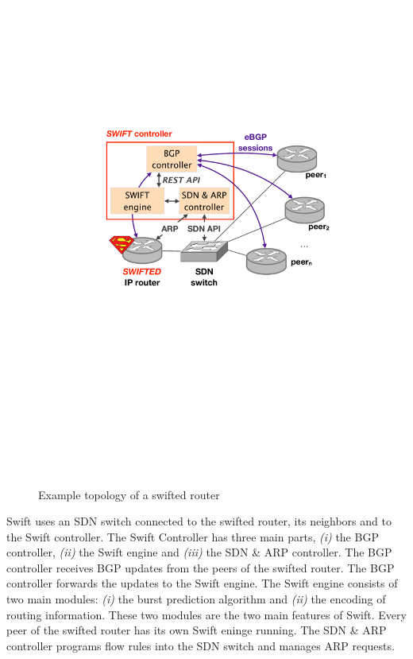 \begin{figure}[h]
\center
\includegraphics[scale = 0.5]{Figures/bckgrnd_swift_architecture.pdf}
\caption{Example topology of a swifted router}
\end{figure}

Swift uses an SDN switch connected to the swifted router, its neighbors and to the Swift controller. The Swift Controller has three main parts, \emph{(i)} the BGP controller, \emph{(ii)} the Swift engine and \emph{(iii)} the SDN \& ARP controller. The BGP controller receives BGP updates from the peers of the swifted router. The BGP controller forwards the updates to the Swift engine. The Swift engine consists of two main modules: \emph{(i)} the burst prediction algorithm and \emph{(ii)} the encoding of routing information. These two modules are the two main features of Swift. Every peer of the swifted router has its own Swift eninge running. The SDN \& ARP controller programs flow rules into the SDN switch and manages ARP requests. 

